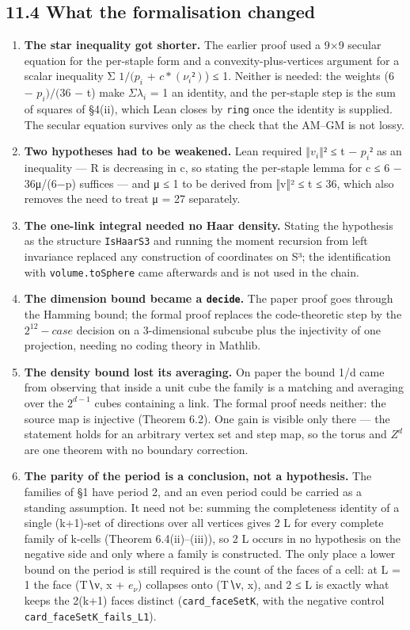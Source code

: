 \documentclass[11pt,a4paper]{article}
\theoremstyle{named}
\begin{document}
\subsection*{11.4 What the formalisation changed}
\begin{enumerate}
\item[1.] \textbf{The star inequality got shorter.} The earlier proof used a 9×9 secular equation for the per-staple form and a convexity-plus-vertices argument for a scalar inequality Σ $1/(p_i$ + $c*(ν_i²)$) ≤ 1. Neither is needed: the weights (6 − $p_i)/(36$ − t) make $Σλ_i$ = 1 an identity, and the per-staple step is the sum of squares of §4(ii), which Lean closes by \texttt{ring} once the identity is supplied. The secular equation survives only as the check that the AM–GM is not lossy.
\item[2.] \textbf{Two hypotheses had to be weakened.} Lean required $‖v_i‖²$ ≤ t − $p_i²$ as an inequality — R is decreasing in c, so stating the per-staple lemma for c ≤ 6 − 36μ/(6−p) suffices — and μ ≤ 1 to be derived from ‖v‖² ≤ t ≤ 36, which also removes the need to treat μ = 27 separately.
\item[3.] \textbf{The one-link integral needed no Haar density.} Stating the hypothesis as the structure \texttt{IsHaarS3} and running the moment recursion from left invariance replaced any construction of coordinates on S³; the identification with \texttt{volume.\allowbreak{}toSphere} came afterwards and is not used in the chain.
\item[4.] \textbf{The dimension bound became a \texttt{decide}.} The paper proof goes through the Hamming bound; the formal proof replaces the code-theoretic step by the $2^12-case$ decision on a 3-dimensional subcube plus the injectivity of one projection, needing no coding theory in Mathlib.
\item[5.] \textbf{The density bound lost its averaging.} On paper the bound 1/d came from observing that inside a unit cube the family is a matching and averaging over the $2^{d−1}$ cubes containing a link. The formal proof needs neither: the source map is injective (Theorem 6.2). One gain is visible only there — the statement holds for an arbitrary vertex set and step map, so the torus and $Z^d$ are one theorem with no boundary correction.
\item[6.] \textbf{The parity of the period is a conclusion, not a hypothesis.} The families of §1 have period 2, and an even period could be carried as a standing assumption. It need not be: summing the completeness identity of a single (k+1)-set of directions over all vertices gives 2 \textbar{} L for every complete family of k-cells (Theorem 6.4(ii)–(iii)), so 2 \textbar{} L occurs in no hypothesis on the negative side and only where a family is constructed. The only place a lower bound on the period is still required is the count of the faces of a cell: at L = 1 the face (T∖ν, x + $e_{ν}$) collapses onto (T∖ν, x), and 2 ≤ L is exactly what keeps the 2(k+1) faces distinct (\texttt{card\_\allowbreak{}faceSetK}, with the negative control \texttt{card\_\allowbreak{}faceSetK\_\allowbreak{}fails\_\allowbreak{}L1}).

\end{enumerate}
\end{document}
